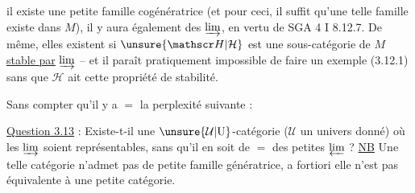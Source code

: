il existe une petite famille cogénératrice\unsure{,|;}
(et pour ceci, il suffit qu'une telle
famille existe dans $M$), il y aura également
des  $\varinjlim$, en vertu de SGA 4 I 8.12.7.
De même, elles existent si $\unsure{\mathscr H|\mathcal H}$ est une
sous-catégorie  de $M$ \uline{stable par}  $\varinjlim$ --
et il paraît pratiquement impossible
de faire un exemple (3.12.1) sans que
$\mathscr H$ ait cette propriété de stabilité.

Sans compter qu'il y a $=$ la perplexité
suivante :

\uline{Question 3.13} : Existe-t-il une
{\reversemarginpar\margin{!\hfill\rule[-2em]{.4pt}{4em}}}%
$\unsure{\mathcal U|\mathrm U}$-catégorie ($\mathcal U$ un univers donné)
où les  $\varinjlim$  soient
représentables, sans qu'il en soit de
$=$ des petites $\varprojlim$ ? \uline{NB} Une
telle catégorie n'admet pas de petite
famille génératrice, a fortiori elle
n'est pas équivalente à une petite
catégorie.

